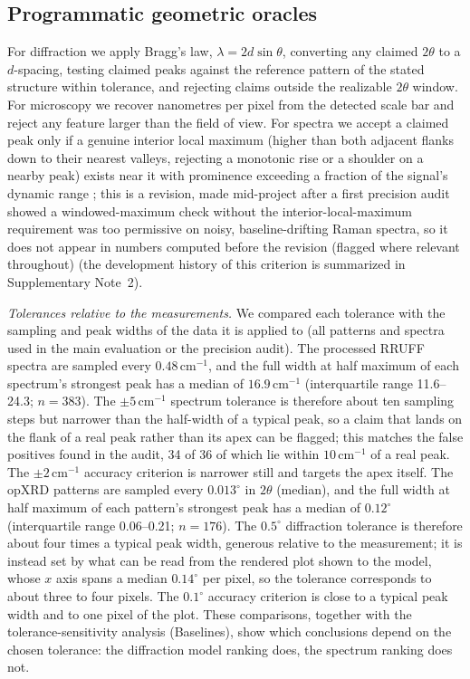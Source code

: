 \documentclass[pdflatex,sn-nature]{sn-jnl}
\newcommand{\rev}[1]{#1} %
\newcommand{\rev}[1]{{\color{blue}#1}} %
\providecommand{\DIFadd}[1]{{\protect\color{blue} \sf #1}} %
\providecommand{\DIFdel}[1]{{\protect\color{red} \scriptsize #1}} %
\providecommand{\DIFaddbegin}{} %
\providecommand{\DIFaddend}{} %
\providecommand{\DIFdelbegin}{} %
\providecommand{\DIFdelend}{} %
\providecommand{\DIFscaledelfig}{0.5}
\newlength{\DIFdelgraphicswidth} %
\newlength{\DIFdelgraphicsheight} %
\providecommand{\DIFaddincludegraphics}[2][]{{\color{blue}\fbox{\DIFOincludegraphics[#1]{#2}}}} %
\providecommand{\DIFdelincludegraphics}[2][]{%
\sbox{\DIFdelgraphicsbox}{\DIFOincludegraphics[#1]{#2}}%
\settoboxwidth{\DIFdelgraphicswidth}{\DIFdelgraphicsbox} %
\settoboxtotalheight{\DIFdelgraphicsheight}{\DIFdelgraphicsbox} %
\scalebox{\DIFscaledelfig}{%
\parbox[b]{\DIFdelgraphicswidth}{\usebox{\DIFdelgraphicsbox}\\[-\baselineskip] \rule{\DIFdelgraphicswidth}{0em}}\llap{\resizebox{\DIFdelgraphicswidth}{\DIFdelgraphicsheight}{%
\setlength{\unitlength}{\DIFdelgraphicswidth}%
\begin{picture}(1,1)%
\thicklines\linethickness{2pt} %
{\color[rgb]{1,0,0}\put(0,0){\framebox(1,1){}}}%
{\color[rgb]{1,0,0}\put(0,0){\line( 1,1){1}}}%
{\color[rgb]{1,0,0}\put(0,1){\line(1,-1){1}}}%
\end{picture}%
}\hspace*{3pt}}} %
} %
\DeclareRobustCommand{\DIFaddbegin}{\DIFOaddbegin \let\includegraphics\DIFaddincludegraphics} %
\DeclareRobustCommand{\DIFaddend}{\DIFOaddend \let\includegraphics\DIFOincludegraphics} %
\DeclareRobustCommand{\DIFdelbegin}{\DIFOdelbegin \let\includegraphics\DIFdelincludegraphics} %
\DeclareRobustCommand{\DIFdelend}{\DIFOaddend \let\includegraphics\DIFOincludegraphics} %
\begin{document}
\subsection*{Programmatic geometric oracles}
For diffraction we apply Bragg's law, $\lambda = 2 d \sin\theta$, converting any
claimed $2\theta$ to a $d$-spacing, testing claimed peaks against the reference
pattern of the stated structure within tolerance, and rejecting claims outside the
realizable $2\theta$ window. For microscopy we recover nanometres per pixel from the
detected scale bar and reject any feature larger than the field of view. For spectra
we accept a claimed peak only if a genuine interior local maximum (higher than both
adjacent flanks down to their nearest valleys, rejecting a monotonic rise or a shoulder on a nearby peak) exists near it with prominence exceeding a fraction of the signal's dynamic range\DIFdelbegin \DIFdel{; this is a revision, made mid-project after a first precision audit showed a windowed-maximum check without the interior-local-maximum requirement was too permissive on noisy, baseline-drifting Raman spectra, so it does not appear in numbers computed before the revision (flagged where relevant throughout)}\DIFdelend \DIFaddbegin \DIFadd{\rev{ (the development history of this criterion is summarized in Supplementary Note~2)}}\DIFaddend .

\DIFaddbegin \DIFadd{\rev{\emph{Tolerances relative to the measurements.} We compared each tolerance with the sampling
and peak widths of the data it is applied to (all patterns and spectra used in the main evaluation
or the precision audit). The processed RRUFF spectra are sampled every $0.48\,\mathrm{cm}^{-1}$, and
the full width at half maximum of each spectrum's strongest peak has a median of
$16.9\,\mathrm{cm}^{-1}$ (interquartile range 11.6--24.3; $n=383$). The $\pm5\,\mathrm{cm}^{-1}$ spectrum
tolerance is therefore about ten sampling steps but narrower than the half-width of a typical peak,
so a claim that lands on the flank of a real peak rather than its apex can be flagged; this matches
the false positives found in the audit, 34 of 36 of which lie within $10\,\mathrm{cm}^{-1}$ of a real
peak. The $\pm2\,\mathrm{cm}^{-1}$ accuracy criterion is narrower still and targets the apex itself.
The opXRD patterns are sampled every $0.013^\circ$ in $2\theta$ (median), and the full width at half
maximum of each pattern's strongest peak has a median of $0.12^\circ$ (interquartile range 0.06--0.21;
$n=176$). The $0.5^\circ$ diffraction tolerance is therefore about four times a typical peak width,
generous relative to the measurement; it is instead set by what can be read from the rendered plot
shown to the model, whose $x$ axis spans a median $0.14^\circ$ per pixel, so the tolerance corresponds to
about three to four pixels. The $0.1^\circ$ accuracy criterion is close to a typical peak width and to
one pixel of the plot. These comparisons, together with the tolerance-sensitivity analysis (Baselines),
show which conclusions depend on the chosen tolerance: the diffraction model ranking does, the
spectrum ranking does not.}
}
\end{document}

